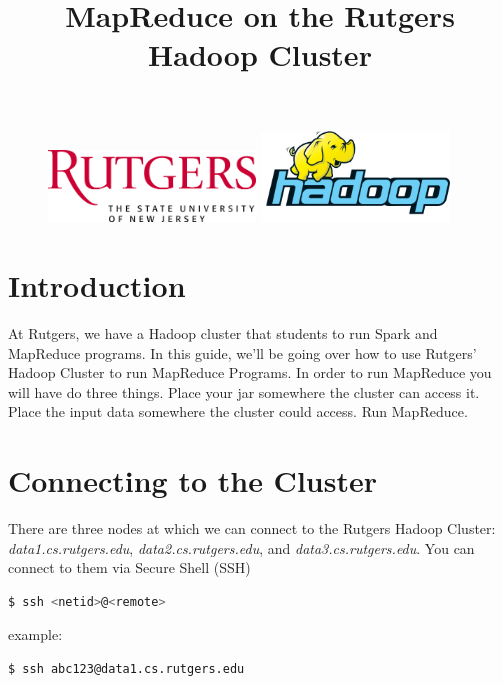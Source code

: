 \documentclass{article}
\title{MapReduce on the Rutgers Hadoop Cluster} %
\date{\vspace{-7ex}}
\begin{document}
\maketitle %


\begin{figure}[h!]
 \centering
 \includegraphics[width=55mm]{images/Rutgers}\hspace{15mm}
 \includegraphics[width=50mm]{images/hadoop}
\end{figure} 


\section*{Introduction} %

At Rutgers, we have a Hadoop cluster that students to run Spark and MapReduce programs. In this guide, we'll be going over how to use Rutgers' Hadoop Cluster to run MapReduce Programs. In order to run MapReduce you will have do three things. Place your jar somewhere the cluster can access it. Place the input data somewhere the cluster could access. Run MapReduce. 



\hypersetup{hidelinks}
\tableofcontents



\section{Connecting to the Cluster}
There are three nodes at which we can connect to the Rutgers Hadoop Cluster: \textit{data1.cs.rutgers.edu}, \textit{data2.cs.rutgers.edu}, and \textit{data3.cs.rutgers.edu}. You can connect to them via Secure Shell (SSH)
\begin{lstlisting}[language=bash]
  $ ssh <netid>@<remote>
\end{lstlisting}
example:
\begin{lstlisting}[language=bash]
  $ ssh abc123@data1.cs.rutgers.edu
\end{lstlisting}
\end{document}
